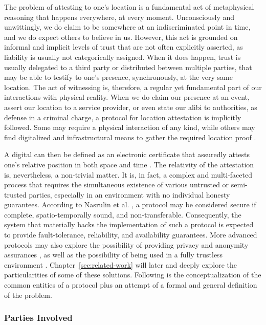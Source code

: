 The problem of attesting to one's location is a fundamental act of metaphysical reasoning that happens everywhere, at every moment. Unconsciously and unwittingly, we do claim to be somewhere at an indiscriminated point in time, and we do expect others to believe in us. However, this act is grounded on informal and implicit levels of trust that are not often explicitly asserted, as liability is usually not categorically assigned. When it does happen, trust is usually delegated to a third party or distributed between multiple parties, that may be able to testify to one's presence, synchronously, at the very same location. The act of witnessing is, therefore, a regular yet fundamental part of our interactions with physical reality. When we do claim our presence at an event, assert our location to a service provider, or even state our alibi to authorities, as defense in a criminal charge, a protocol for location attestation is implicitly followed. Some may require a physical interaction of any kind, while others may find digitalized and infrastructural means to gather the required location proof \cite{luo2010veriplace}.

A digital \pol{} can then be defined as an electronic certificate that assuredly attests one's relative position in both space and time \cite{amoretti2018blockchain}. The relativity of the attestation is, nevertheless, a non-trivial matter. It is, in fact, a complex and multi-faceted process that requires the simultaneous existence of various untrusted or semi-trusted parties, especially in an environment with no individual honesty guarantees. According to Nasrulin et al. \cite{nasrulin2018robust}, a \pol{} protocol may be considered secure if complete, spatio-temporally sound, and non-transferable. Consequently, the system that materially backs the implementation of such a protocol is expected to provide fault-tolerance, reliability, and availability guarantees. More advanced protocols may also explore the possibility of providing privacy and anonymity assurances \cite{li2020privacy}, as well as the possibility of being used in a fully trustless environment \cite{amoretti2018blockchain}. Chapter~\ref{sec:related-work} will later and deeply explore the particularities of some of these solutions. Following is the conceptualization of the common entities of a \pol{} protocol plus an attempt of a formal and general definition of the problem.

\subsubsection{Parties Involved}

